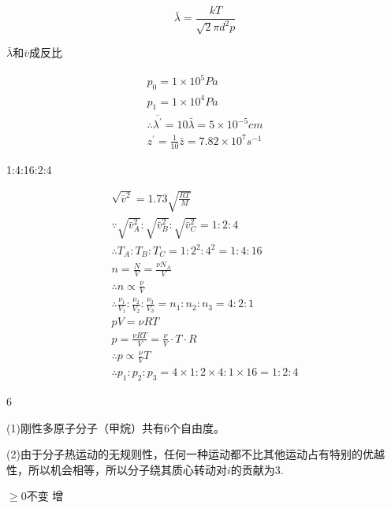 \documentclass[b5paper,opensource]{./template/qyxf-book}
\begin{document}
\solve

$$
\bar { \lambda } = \frac { k T } { \sqrt { 2 } \pi d ^ { 2 } p }
$$

$\bar { \lambda } $和$\bar { v } $成反比

$$
\begin{array} { l }
 { p _ { 0 } = 1 \times 10 ^ { 5 } P a } \\ { p _ { 1 } = 1 \times 10 ^ { 4 } P a } \\ { \therefore \overline { \lambda ^ { \prime } } = 10 \bar { \lambda } = 5 \times 10 ^ { - 5 } c m } \\ { z ^ { \prime } = \frac { 1 } { 10 } \bar { z } = 7.82 \times 10 ^ { 7 } s ^ { - 1 } }
\end{array}
$$

 1:4:16:2:4

\solve

$$
\begin{array}{*{20}{c}}
 \sqrt { \bar { v } ^ { 2 } } = 1.73 \sqrt { \frac { R T } { M } } \\ \because \sqrt { \bar { v } _ { A } ^ { 2 } } : \sqrt { \bar { v } _ { B } ^ { 2 } }  : \sqrt { \bar { v } _ { C } ^ { 2 } } = 1 : 2 : 4 \\ \therefore T _ { A } : T _ { B } : T _ { C } = 1 : 2 ^ { 2 } : 4 ^ { 2 } = 1 : 4 : 16 \\ n = \frac { N } { V } = \frac { \nu N _ { A } } { V } \\ \therefore n \propto \frac { \nu } { V }\\ \therefore \frac { \nu _ { 1 } } { V _ { 1 } } : \frac { \nu _ { 2 } } { V _ { 2 } } : \frac { \nu _ { 3 } } { V _ { 3 } }  = n _ { 1 } : n _ { 2 } : n _ { 3 } = 4 : 2 : 1 \\ p V  = \nu R T \\ p = \frac { \nu R T } { V }  = \frac { \nu } { V } \cdot T \cdot R \\ \therefore p  \propto \frac { \nu } { V } T \\ \therefore p _ { 1 } : p _ { 2 } : p _ { 3 } = 4 \times 1 : 2 \times 4 : 1 \times 16 = 1 : 2 : 4  
\end{array}
$$

6

\solve (1)刚性多原子分子（甲烷）共有6个自由度。

(2)由于分子热运动的无规则性，任何一种运动都不比其他运动占有特别的优越性，所以机会相等，所以分子绕其质心转动对$i$的贡献为3.

$\geqslant 0 $\qquad 不变 \qquad 增
\end{document}
